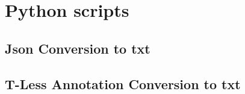 \chapter{Python scripts}
\section{Json Conversion to txt}\label{sec:json_conversion}

\section{T-Less Annotation Conversion to txt}\label{sec:tless_conv}


